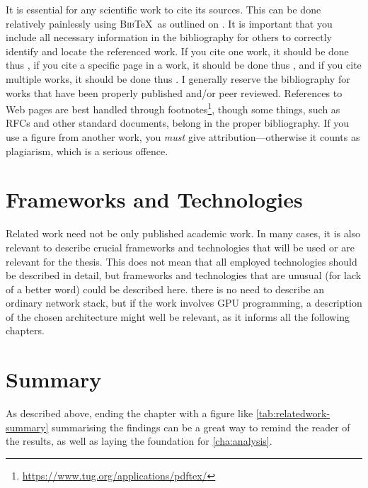 It is essential for any scientific work to cite its sources. This can be done
relatively painlessly using \textsc{Bib}\negthinspace\TeX\ as outlined on
. It is important that you include all necessary
information in the bibliography for others to correctly identify and locate
the referenced work. If you cite one work, it should be done thus
\cite{Kristensen2010:MP2P2010}, if you cite a specific page in a work, it
should be done thus \cite[p. 410]{Chawathe2003:2003}, and if you cite multiple
works, it should be done thus
\cite{knuth:1976,knuth:1974,Kristensen2010:MP2P2010,Mittelbach2004:TLC2004}.  I generally 
reserve the bibliography for works that have been properly published and/or
peer reviewed. References to Web pages are best handled through
footnotes\footnote{\url{https://www.tug.org/applications/pdftex/}}, though
some things, such as RFCs and other standard documents, belong in the proper
bibliography. If you use a figure from another work, you \emph{must} give
attribution---otherwise it counts as plagiarism, which is a serious offence. 


\section{Frameworks and Technologies}
\label{sec:fram-techn}

Related work need not be only published academic work. In many cases,
it is also relevant to describe crucial frameworks and technologies
that will be used or are relevant for the thesis.  This does not mean
that all employed technologies should be described in detail, but
frameworks and technologies that are unusual (for lack of a better
word) could be described here. \Eg there is no need to describe an
ordinary network stack, but if the work involves GPU programming, a
description of the chosen architecture might well be relevant, as it
informs all the following chapters.

\section{Summary}
\label{sec:summary}
As described above, ending the chapter with a figure like
\autoref{tab:relatedwork-summary} summarising the findings can be a great way
to remind the reader of the results, as well as laying the foundation for
\autoref{cha:analysis}.



